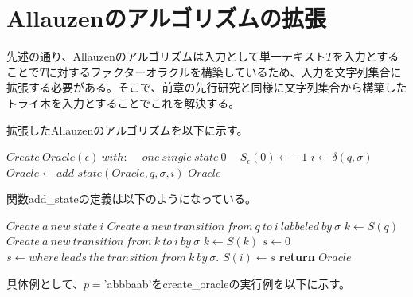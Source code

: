 \documentclass[11pt,a4paper]{jreport}
\begin{document}
  \section{Allauzenのアルゴリズムの拡張}
  先述の通り、Allauzenのアルゴリズムは入力として単一テキスト$T$を入力とすることで$T$に対するファクターオラクルを構築しているため、入力を文字列集合に拡張する必要がある。そこで、前章の先行研究と同様に文字列集合から構築したトライ木を入力とすることでこれを解決する。

  拡張したAllauzenのアルゴリズムを以下に示す。

  \begin{algorithm}
    \caption{$\textbf{create\_oracle}(M)$}
    \label{alg7}
    \begin{algorithmic}[1]
      \State $Create\ Oracle(\epsilon)\ with:$
      \State $\ \ \ \ one\ single\ state\ 0$
      \State $\ \ \ \ S_\epsilon(0) \leftarrow -1$
          \State $i \leftarrow \delta(q, \sigma)$
          \State $Oracle \leftarrow add\_state(Oracle, q, \sigma, i)$
        \EndFor
      \EndFor
      \Return $Oracle$
    \end{algorithmic}
  \end{algorithm}
  
  関数add\_stateの定義は以下のようになっている。

  \begin{algorithm}
    \caption{$\textbf{add\_state}(Oracle, q, \sigma, i)$}
    \label{alg8}
    \begin{algorithmic}[1]
      \State $Create\ a\ new\ state\ i$
      \State $Create\ a\ new\ transition\ from\ q\ to\ i\ labbeled\ by\ \sigma$
      \State $k \leftarrow S(q)$
      \State $Create\ a\ new\ transition\ from\ k\ to\ i\ by\ \sigma$
      \State $k \leftarrow S(k)$
      \EndWhile
      \State $s \leftarrow 0$
      \Else
      \State $s \leftarrow where\ leads\ the\ transition\ from\ k\ by\ \sigma.$
      \EndIf
      \State $S(i) \leftarrow s$
      \State \textbf{return} $Oracle$
    \end{algorithmic}
  \end{algorithm}

  具体例として、$p=$'abbbaab'をcreate\_oracleの実行例を以下に示す。
  \newpage
\end{document}
